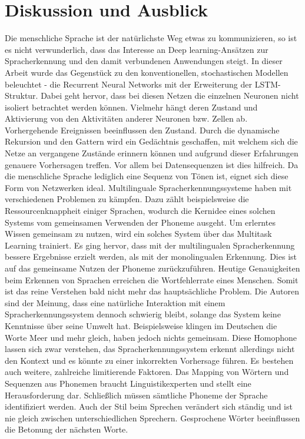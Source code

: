 \section{Diskussion und Ausblick}
Die menschliche Sprache ist der natürlichste Weg etwas zu kommunizieren, so ist es nicht verwunderlich, dass das Interesse an Deep learning-Ansätzen zur Spracherkennung und den damit verbundenen Anwendungen steigt. In dieser Arbeit wurde das Gegenstück zu den konventionellen, stochastischen Modellen beleuchtet - die Recurrent Neural Networks mit der Erweiterung der LSTM-Struktur. Dabei geht hervor, dass bei diesen Netzen die einzelnen Neuronen nicht isoliert betrachtet werden können. Vielmehr hängt deren Zustand und Aktivierung von den Aktivitäten anderer Neuronen bzw. Zellen ab. Vorhergehende Ereignissen beeinflussen den Zustand. Durch die dynamische Rekursion und den Gattern wird ein Gedächtnis geschaffen, mit welchem sich die Netze an vergangene Zustände erinnern können und aufgrund dieser Erfahrungen genauere Vorhersagen treffen. Vor allem bei Datensequenzen ist dies hilfreich. Da die menschliche Sprache lediglich eine Sequenz von Tönen ist, eignet sich diese Form von Netzwerken ideal.\newline
Multilinguale Spracherkennungssysteme haben mit verschiedenen Problemen zu kämpfen. Dazu zählt beispielsweise die Ressourcenknappheit einiger Sprachen, wodurch die Kernidee eines solchen Systems vom gemeinsamen Verwenden der Phoneme ausgeht. Um erlerntes Wissen gemeinsam zu nutzen, wird ein solches System über das Multitask Learning trainiert. Es ging hervor, dass mit der multilingualen Spracherkennung bessere Ergebnisse erzielt werden, als mit der monolingualen Erkennung. Dies ist auf das gemeinsame Nutzen der Phoneme zurückzuführen. Heutige Genauigkeiten beim Erkennen von Sprachen erreichen die Wortfehlerrate eines Menschen. Somit ist das reine Verstehen bald nicht mehr das hauptsächliche Problem. Die Autoren sind der Meinung, dass eine natürliche Interaktion mit einem Spracherkennungssystem dennoch schwierig bleibt, solange das System keine Kenntnisse über seine Umwelt hat. Beispielsweise klingen im Deutschen die Worte Meer und mehr gleich, haben jedoch nichts gemeinsam. Diese Homophone lassen sich zwar verstehen, das Spracherkennungssystem erkennt allerdings nicht den Kontext und es könnte zu einer inkorrekten Vorhersage führen. Es bestehen auch weitere, zahlreiche limitierende Faktoren. Das Mapping von Wörtern und Sequenzen aus Phonemen braucht Linguistikexperten und stellt eine Herausforderung dar. Schließlich müssen sämtliche Phoneme der Sprache identifiziert werden. Auch der Stil beim Sprechen verändert sich ständig und ist nie gleich zwischen unterschiedlichen Sprechern. Gesprochene Wörter beeinflussen die Betonung der nächsten Worte.\newline
